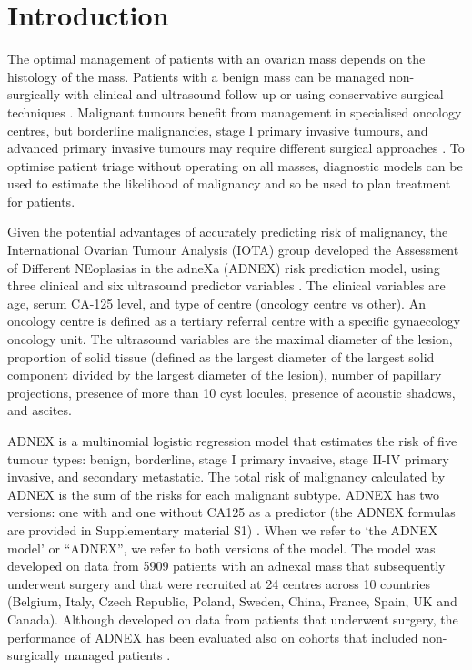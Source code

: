 \newpage

\section{Introduction}

The optimal management of patients with an ovarian mass depends on the histology
of the mass. Patients with a benign mass can be managed non-surgically with
clinical and ultrasound follow-up or using conservative surgical techniques 
 \cite{carleyLaparoscopyLaparotomyManagement2002,
froymanRiskComplicationsPatients2019}.
Malignant tumours benefit from management in specialised oncology centres, but
borderline malignancies, stage I primary invasive tumours, and advanced primary
invasive tumours may require different surgical approaches
 \cite{wooCentralisationServicesGynaecological2012,
timmermanESGOISUOGIOTA2021}.
To optimise patient triage without operating on all masses, diagnostic models
can be used to estimate the likelihood of malignancy and so be used to plan
treatment for patients.

Given the potential advantages of accurately predicting risk of malignancy, the
International Ovarian Tumour Analysis (\gls{IOTA}) group developed the Assessment of
Different NEoplasias in the adneXa (\gls{ADNEX}) risk prediction model, using three
clinical and six ultrasound predictor variables
 \cite{vancalsterEvaluatingRiskOvarian2014}. The clinical variables are age,
serum CA-125 level, and type of centre (oncology centre vs other). An oncology
centre is defined as a tertiary referral centre with a specific gynaecology
oncology unit. The ultrasound variables are the maximal diameter of the lesion,
proportion of solid tissue (defined as the largest diameter of the largest solid
component divided by the largest diameter of the lesion), number of papillary
projections, presence of more than 10 cyst locules, presence of acoustic
shadows, and ascites.

\gls{ADNEX} is a multinomial logistic regression model that estimates the risk of five
tumour types: benign, borderline, stage I primary invasive, stage II-IV primary
invasive, and secondary metastatic. The total risk of malignancy calculated by
\gls{ADNEX} is the sum of the risks for each malignant subtype. \gls{ADNEX} has two
versions: one with and one without CA125 as a predictor (the \gls{ADNEX} formulas are
provided in Supplementary material S1)
 \cite{vancalsterEvaluatingRiskOvarian2014}. When we refer to ‘the \gls{ADNEX} model’
or “\gls{ADNEX}”, we refer to both versions of the model. The model was developed on
data from 5909 patients with an adnexal mass that subsequently underwent surgery
and that were recruited at 24 centres across 10 countries (Belgium, Italy, Czech
Republic, Poland, Sweden, China, France, Spain, UK and Canada). Although
developed on data from patients that underwent surgery, the performance of \gls{ADNEX}
has been evaluated also on cohorts that included non-surgically managed patients
 \cite{vancalsterValidationModelsDiagnose2020,
hackExternalValidationORADS2022,
jeongValidationIOTAADNEXModel2020,
quarantaSurgeryBenignOvarian2020}.

